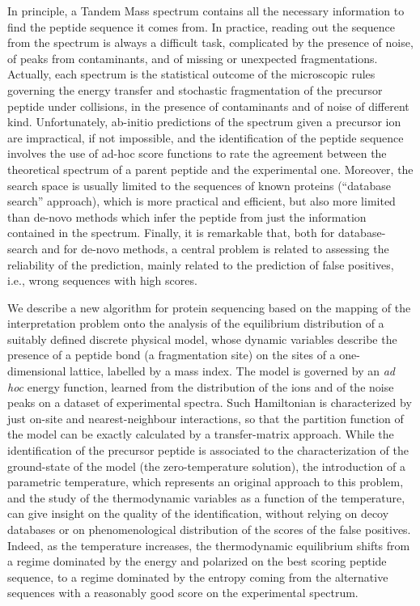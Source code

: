In principle,  a Tandem Mass spectrum contains all  the necessary information to find
the peptide sequence it comes from. In practice, reading out the sequence from the spectrum is always a difficult task, complicated by the presence of noise, of peaks from contaminants, and of missing or unexpected fragmentations.  
Actually, each spectrum is the statistical outcome of  the microscopic rules
governing the energy transfer and stochastic fragmentation of the precursor
peptide under collisions, in the presence of contaminants and of noise of
different kind.  Unfortunately, ab-initio predictions of the spectrum given a
precursor ion are  impractical, if not impossible,  and  the identification of
the peptide sequence involves the use of ad-hoc score functions to rate the
agreement between the  theoretical spectrum of a parent peptide and the
experimental one.  Moreover, the search space is usually limited to the
sequences of  known proteins (``database search'' approach), which is more
practical and efficient, but also more limited than de-novo methods which infer
the peptide from just the information contained in the spectrum. 
Finally, it is remarkable that, both for database-search and for de-novo
methods, a central problem is related to assessing the reliability of the
prediction, mainly related to the prediction of  false positives, i.e., wrong
sequences with high scores.

We describe a new algorithm for  protein sequencing based on the mapping of the
interpretation problem onto the analysis of the equilibrium distribution of a
suitably defined discrete physical model, whose dynamic variables describe the
presence of a peptide bond (a fragmentation site) on the sites of a
one-dimensional lattice, labelled by a mass index.
The model is governed by an \emph{ad hoc} energy function,  learned from the
distribution of the ions and of the noise peaks on a dataset of
experimental spectra.  Such Hamiltonian is characterized by just on-site and
nearest-neighbour interactions, so that the partition function of the model can
be exactly calculated by a transfer-matrix approach. While the identification of
the precursor peptide is associated to the characterization of the ground-state
of the model (the zero-temperature solution),
the introduction of a parametric temperature, which represents an original
approach to this problem, and the study of the thermodynamic variables as a
function of the temperature, can give insight on the quality of the
identification, without relying on decoy databases or on phenomenological
distribution of the scores of the false positives.
Indeed, as the temperature increases, the thermodynamic equilibrium shifts from
a regime dominated by the energy and polarized on the best scoring peptide
sequence, to a regime dominated by the entropy coming from  the alternative
sequences with a reasonably good  score on the experimental spectrum.

